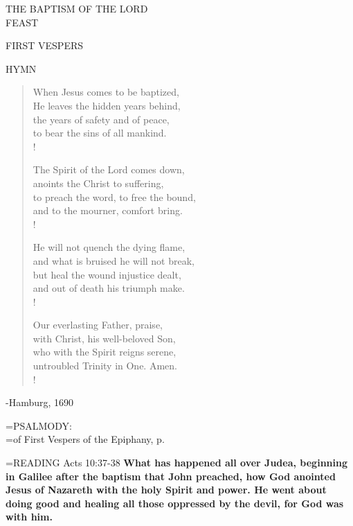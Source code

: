 \begin{center}\normalsize THE BAPTISM OF THE LORD\\
\footnotesize FEAST\\
\end{center}

\begin{flushleft}\normalsize FIRST VESPERS\\\end{flushleft}

\noindent\small{\uppercase{Hymn }}\normalsize\label{baptism:hymn}
\begin{verse}
When Jesus comes to be baptized,\\
He leaves the hidden years behind,\\
the years of safety and of peace,\\
to bear the sins of all mankind.\\!

The Spirit of the Lord comes down,\\
anoints the Christ to suffering,\\
to preach the word, to free the bound,\\
and to the mourner, comfort bring.\\!

He will not quench the dying flame,\\
and what is bruised he will not break,\\
but heal the wound injustice dealt,\\
and out of death his triumph make.\\!

Our everlasting Father, praise,\\
with Christ, his well-beloved Son,\\
who with the Spirit reigns serene,\\
untroubled Trinity in One. Amen.\\!
\end{verse}
\begin{flushright}\tiny -Hamburg, 1690\end{flushright}

\hangindent=\parindent \small{PSALMODY:}\\
\hangindent=\parindent  of First Vespers of the Epiphany, p. \pageref{epiphany:firstVespers}\vspace{0.5em}

\hangindent=\parindent \small{READING}   Acts 10:37-38 \textbf{  What has happened all over Judea, beginning in Galilee after the baptism that John preached, how God anointed Jesus of Nazareth with the holy Spirit and power. He went about doing good and healing all those oppressed by the devil, for God was with him.\\}

